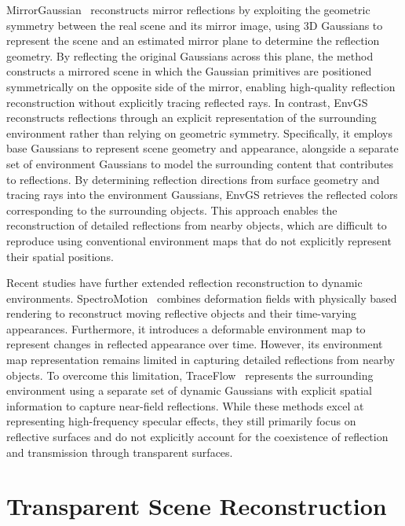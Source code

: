 MirrorGaussian~\cite{liu2024} reconstructs mirror reflections by exploiting the geometric symmetry between the real scene and its mirror image, using 3D Gaussians to represent the scene and an estimated mirror plane to determine the reflection geometry. By reflecting the original Gaussians across this plane, the method constructs a mirrored scene in which the Gaussian primitives are positioned symmetrically on the opposite side of the mirror, enabling high-quality reflection reconstruction without explicitly tracing reflected rays. In contrast, EnvGS~\cite{xie2025} reconstructs reflections through an explicit representation of the surrounding environment rather than relying on geometric symmetry. Specifically, it employs base Gaussians to represent scene geometry and appearance, alongside a separate set of environment Gaussians to model the surrounding content that contributes to reflections. By determining reflection directions from surface geometry and tracing rays into the environment Gaussians, EnvGS retrieves the reflected colors corresponding to the surrounding objects. This approach enables the reconstruction of detailed reflections from nearby objects, which are difficult to reproduce using conventional environment maps that do not explicitly represent their spatial positions.

Recent studies have further extended reflection reconstruction to dynamic environments. SpectroMotion~\cite{fan2025} combines deformation fields with physically based rendering to reconstruct moving reflective objects and their time-varying appearances. Furthermore, it introduces a deformable environment map to represent changes in reflected appearance over time. However, its environment map representation remains limited in capturing detailed reflections from nearby objects. To overcome this limitation, TraceFlow~\cite{tao2025} represents the surrounding environment using a separate set of dynamic Gaussians with explicit spatial information to capture near-field reflections. While these methods excel at representing high-frequency specular effects, they still primarily focus on reflective surfaces and do not explicitly account for the coexistence of reflection and transmission through transparent surfaces.

\section{Transparent Scene Reconstruction}

